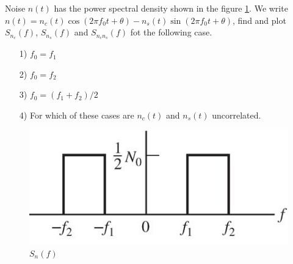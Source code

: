 \documentclass{assignment}
\begin{document}
\begin{prob}
    Noise $n(t)$ has the power spectral density shown in the figure \ref{figure1}. We write $n(t)=n_c(t)\cos(2\pi f_0t+\theta)-n_s(t)\sin(2\pi f_0t+\theta)$, find and plot $S_{n_c}(f)$, $S_{n_s}(f)$ and $S_{n_cn_s}(f)$ fot the following case.
    \begin{itemize}
        \item[1)] $f_0=f_1$
        \item[2)] $f_0=f_2$
        \item[3)] $f_0=(f_1+f_2)/2$
        \item[4)] For which of these cases are $n_c(t)$ and $n_s(t)$ uncorrelated.
    \end{itemize}
    \begin{figure}[h]
        \centering
        \includegraphics[width=.5\textwidth]{Figure1.jpg}
        \caption{$S_n(f)$}\label{figure1}
    \end{figure}
\end{prob}
\end{document}
